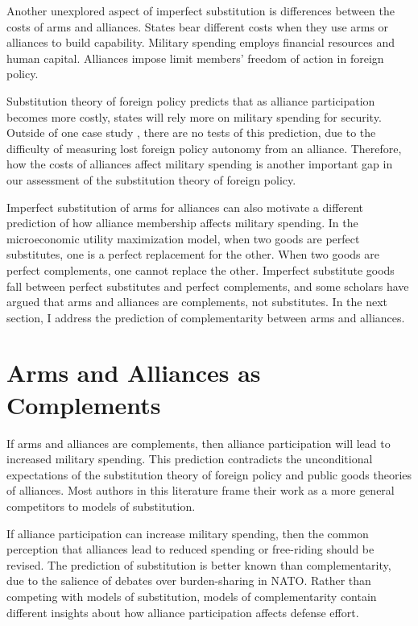 \documentclass[12pt]{article}
\begin{document}
Another unexplored aspect of imperfect substitution is differences between the costs of arms and alliances. 
States bear different costs when they use arms or alliances to build capability.
Military spending employs financial resources and human capital. 
Alliances impose limit members' freedom of action in foreign policy. 


Substitution theory of foreign policy predicts that as alliance participation becomes more costly, states will rely more on military spending for security.
Outside of one case study \citep{Morrow1993}, there are no tests of this prediction, due to the difficulty of measuring lost foreign policy autonomy from an alliance. 
Therefore, how the costs of alliances affect military spending is another important gap in our assessment of the substitution theory of foreign policy. 


Imperfect substitution of arms for alliances can also motivate a different prediction of how alliance membership affects military spending.
In the microeconomic utility maximization model, when two goods are perfect substitutes, one is a perfect replacement for the other.
When two goods are perfect complements, one cannot replace the other. 
Imperfect substitute goods fall between perfect substitutes and perfect complements, and some scholars have argued that arms and alliances are complements, not substitutes.  
In the next section, I address the prediction of complementarity between arms and alliances. 




\section{Arms and Alliances as Complements}


If arms and alliances are complements, then alliance participation will lead to increased military spending. 
This prediction contradicts the unconditional expectations of the substitution theory of foreign policy and public goods theories of alliances. 
Most authors in this literature frame their work as a more general competitors to models of substitution. 


If alliance participation can increase military spending, then the common perception that alliances lead to reduced spending or free-riding should be revised. 
The prediction of substitution is better known than complementarity, due to the salience of debates over burden-sharing in NATO. 
Rather than competing with models of substitution, models of complementarity contain different insights about how alliance participation affects defense effort. 
\end{document}
